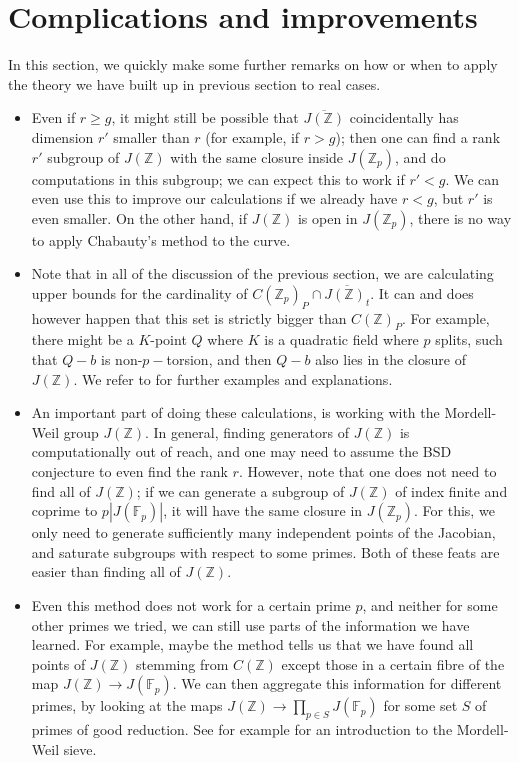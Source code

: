 \documentclass[12pt]{article}
\newcommand{\Z}{\mathbb{Z}}
\newcommand{\F}{\mathbb{F}}
\theoremstyle{plain}
\theoremstyle{definition}
\theoremstyle{remark}
\begin{document}
\section{Complications and improvements}
\label{section:remarks} 
In this section, we quickly make some further remarks on how or when to apply the theory we have built up in previous section to real cases.
\begin{itemize} 
\item Even if $r \geq g$, it might still be possible that $\overline{J(\Z)}$ coincidentally has dimension $r'$ smaller than $r$ (for example, if $r > g$); then one can find a rank $r'$ subgroup of $J(\Z)$ with the same closure inside $J(\Z_p)$, and do computations in this subgroup; we can expect this to work if $r' < g$. We can even use this to improve our calculations if we already have $r < g$, but $r'$ is even smaller. On the other hand, if $J(\Z)$ is open in $J(\Z_p)$, there is no way to apply Chabauty's method to the curve.
\item Note that in all of the discussion of the previous section, we are calculating upper bounds for the cardinality of $C(\Z_p)_P \cap \overline{J(\Z)_t}$. It can and does however happen that this set is strictly bigger than $C(\Z)_P$. For example, there might be a $K$-point $Q$ where $K$ is a quadratic field where $p$ splits, such that $Q-b$ is non-$p-$torsion, and then $Q-b$ also lies in the closure of $J(\Z)$. We refer to \citep{Balakrishnan19} for further examples and explanations. 
\item An important part of doing these calculations, is working with the Mordell-Weil group $J(\Z)$. In general, finding generators of $J(\Z)$ is computationally out of reach, and one may need to assume the BSD conjecture to even find the rank $r$. However, note that one does not need to find all of $J(\Z)$; if we can generate a subgroup of $J(\Z)$ of index finite and coprime to $p|J(\F_p)|$, it will have the same closure in $J(\Z_p)$. For this, we only need to generate sufficiently many independent points of the Jacobian, and saturate subgroups with respect to some primes. Both of these feats are easier than finding all of $J(\Z)$.
\item Even this method does not work for a certain prime $p$, and neither for some other primes we tried, we can still use parts of the information we have learned. For example, maybe the method tells us that we have found all points of $J(\Z)$ stemming from $C(\Z)$ except those in a certain fibre of the map $J(\Z) \to J(\F_p)$. We can then aggregate this information for different primes, by looking at the maps $J(\Z) \to \prod_{p \in S} J(\F_p)$ for some set $S$ of primes of good reduction. See for example \citep{stoll10} for an introduction to the Mordell-Weil sieve.
\end{itemize}
\end{document}
